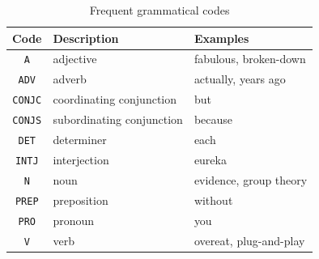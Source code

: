 \begin{table}[!h]
\begin{center}
\begin{tabular}{|c|l|l|}
\hline
\textbf{Code} & \textbf{Description} & \textbf{Examples} \\
\hline
\verb+A+ & adjective & fabulous, broken-down \\
\hline
\verb+ADV+ & adverb & actually, years ago \\
\hline
\verb+CONJC+ & coordinating conjunction & but\\
\hline
\verb+CONJS+ & subordinating conjunction & because \\
\hline
\verb+DET+ & determiner & each \\
\hline
\verb+INTJ+ & interjection & eureka \\
\hline
\verb+N+ & noun & evidence, group theory \\
\hline
\verb+PREP+ & preposition & without \\
\hline
\verb+PRO+ & pronoun & you \\
\hline
\verb+V+ & verb & overeat, plug-and-play \\
\hline
\end{tabular}
\caption{Frequent grammatical codes\label{tab-grammatical-codes}}
\end{center}
\end{table}

